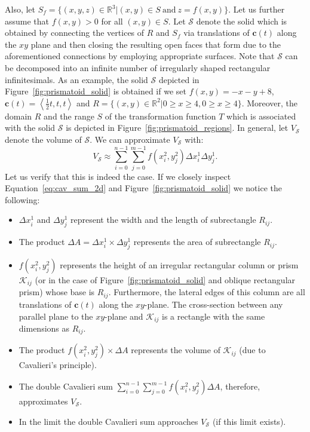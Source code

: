 \documentclass{article}
\theoremstyle{theorem}
\theoremstyle{definition}
\begin{document}
\noindent
Also, let $S_f = \{(x,y,z)\in\mathbb{R}^3|(x,y)\in S ~ \textrm{and} ~ z=f(x,y)\}$.  Let us further assume that $f(x,y) > 0$ for all $(x,y)\in S$. Let $\mathcal{S}$ denote the solid which is obtained by connecting the vertices of $R$ and 
$S_f$ via translations of $\mathbf{c}(t)$ along the $xy$ plane and then closing the resulting open faces that form due to the aforementioned connections by employing appropriate surfaces. Note that 
$\mathcal{S}$ can be decomposed into an infinite number of irregularly shaped rectangular infinitesimals. As an example, the solid $\mathcal{S}$ depicted in Figure~\ref{fig:prismatoid_solid} is obtained if we set $f(x,y) = -x - y + 8$, $\mathbf{c}(t) = \left<\frac{1}{2}t,t,t\right>$ and $R = \{(x,y)\in\mathbb{R}^2|0 \geq x \geq 4, 0 \geq x \geq 4\} \nonumber$.
Moreover, the domain $R$ and the range $S$ of the transformation function $T$ which is associated with the solid $\mathcal{S}$ is depicted in Figure~\ref{fig:prismatoid_regions}.  
In general, let $V_{\mathcal{S}}$ denote the volume of $\mathcal{S}$. We can approximate $V_{\mathcal{S}}$ with:
\begin{equation}
\label{eq:cav_sum_2d}
V_{\mathcal{S}} \approx \sum_{i=0}^{n-1} \sum_{j=0}^{m-1} f(x_i^2,y_j^2) \Delta x_i^1 \Delta y_j^1.
\end{equation}
Let us verify that this is indeed the case. If we closely inspect Equation~\eqref{eq:cav_sum_2d} and Figure~\ref{fig:prismatoid_solid} we notice the following:
\begin{itemize}
\item $\Delta x_i^1$ and $\Delta y_j^1$ represent the width and the length of subrectangle $R_{ij}$.
\item The product $\Delta A = \Delta x_i^1\times \Delta y_j^1$ represents the area of subrectangle $R_{ij}$.
\item $f(x_i^2,y_j^2)$ represents the height of an irregular rectangular column or prism $\mathcal{K}_{ij}$ (or in the case of Figure~\ref{fig:prismatoid_solid} and oblique rectangular prism) whose base is $R_{ij}$. Furthermore, the lateral edges of this column are all translations 
of $\mathbf{c}(t)$ along the $xy$-plane. The cross-section between any parallel plane to the $xy$-plane and $\mathcal{K}_{ij}$ is a rectangle with the same dimensions as $R_{ij}$. 
\item The product $f(x_i^2,y_j^2)\times \Delta A$ represents the volume of $\mathcal{K}_{ij}$ (due to Cavalieri's principle).
\item The double Cavalieri sum $\sum_{i=0}^{n-1} \sum_{j=0}^{m-1} f(x_i^2,y_j^2) \Delta A$, therefore, approximates $V_{\mathcal{S}}$. 
\item In the limit the double Cavalieri sum approaches $V_{\mathcal{S}}$ (if this limit exists). 
\end{itemize}
\end{document}
